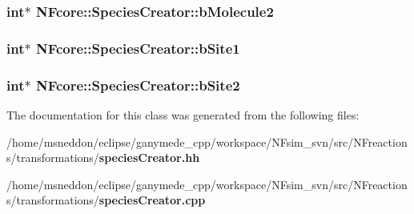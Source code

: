 \subsubsection{\setlength{\rightskip}{0pt plus 5cm}int$\ast$ {\bf NFcore::SpeciesCreator::bMolecule2}\hspace{0.3cm}{\tt  [protected]}}\label{classNFcore_1_1SpeciesCreator_8d4caa643ae21910fc49577331b6e9aa}


\subsubsection{\setlength{\rightskip}{0pt plus 5cm}int$\ast$ {\bf NFcore::SpeciesCreator::bSite1}\hspace{0.3cm}{\tt  [protected]}}\label{classNFcore_1_1SpeciesCreator_5c07bfe05a98d21564079015559defc0}


\subsubsection{\setlength{\rightskip}{0pt plus 5cm}int$\ast$ {\bf NFcore::SpeciesCreator::bSite2}\hspace{0.3cm}{\tt  [protected]}}\label{classNFcore_1_1SpeciesCreator_709c3005ce881579df83cb7c3e0c45aa}




The documentation for this class was generated from the following files:\begin{CompactItemize}
\item 
/home/msneddon/eclipse/ganymede\_\-cpp/workspace/NFsim\_\-svn/src/NFreactions/transformations/{\bf speciesCreator.hh}\item 
/home/msneddon/eclipse/ganymede\_\-cpp/workspace/NFsim\_\-svn/src/NFreactions/transformations/{\bf speciesCreator.cpp}\end{CompactItemize}
